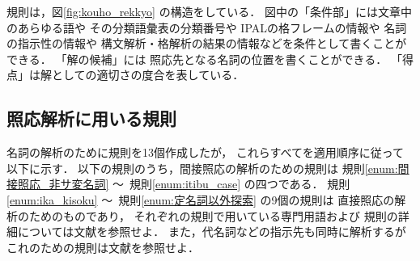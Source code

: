 規則は，図\ref{fig:kouho_rekkyo} の構造をしている．
図中の「条件部」には文章中のあらゆる語や
その分類語彙表\cite{bgh}の分類番号や
IPALの格フレーム\cite{ipal}の情報や
名詞の指示性の情報や
構文解析・格解析の結果の情報などを条件として書くことができる．
「解の候補」には
照応先となる名詞の位置を書くことができる．
「得点」は解としての適切さの度合を表している．


\subsection{照応解析に用いる規則}

名詞の解析のために規則を13個作成したが，
これらすべてを適用順序に従って以下に示す．
以下の規則のうち，間接照応の解析のための規則は
規則\ref{enum:間接照応_非サ変名詞} 〜\ 
規則\ref{enum:itibu_case} の四つである．
規則\ref{enum:ika_kisoku} 〜\ 
規則\ref{enum:定名詞以外探索} の9個の規則は
直接照応の解析のためのものであり，
それぞれの規則で用いている専門用語および
規則の詳細については文献\cite{murata_noun_nlp}を参照せよ．
また，代名詞などの指示先も同時に解析するが
これのための規則は文献\cite{murata_deno_nl95}を参照せよ．


